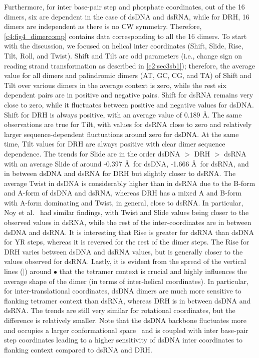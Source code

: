 Furthermore, for inter base-pair step and phosphate coordinates, out of the 16 dimers, six are dependent in the case of dsDNA and dsRNA, while for DRH, 16 dimers are independent as there is no CW symmetry. 
Therefore, \cref{c4:fig4_dimercomp} contains data corresponding to all the 16 dimers.
To start with the discussion, we focused on helical inter coordinates (Shift, Slide, Rise, Tilt, Roll, and Twist).
Shift and Tilt are odd parameters (i.e., change sign on reading strand transformation as described in \cref{c2:sec3sb1}); therefore, the average value for all dimers and palindromic dimers (AT, GC, CG, and TA) of Shift and Tilt over various dimers in the average context is zero, while the rest six dependent pairs are in positive and negative pairs. 
Shift for dsRNA remains very close to zero, while it fluctuates between positive and negative values for dsDNA.
Shift for DRH is always positive, with an average value of 0.189 \AA.
The same observations are true for Tilt, with values for dsRNA close to zero and relatively larger sequence-dependent fluctuations around zero for dsDNA.
At the same time, Tilt values for DRH are always positive with clear dimer sequence dependence.
The trends for Slide are in the order dsDNA $>$ DRH $>$ dsRNA with an average Slide of around -0.397 \AA \ for dsDNA, -1.666 \AA \ for dsRNA, and in between dsDNA and dsRNA for DRH but slightly closer to dsRNA.
The average Twist in dsDNA is considerably higher than in dsRNA due to the B-form and A-form of dsDNA and dsRNA, whereas DRH has a mixed A and B-form with A-form dominating and Twist, in general, close to dsRNA.
In particular, Noy et al.~\cite{noy2005structure} had similar findings, with Twist and Slide values being closer to the observed values in dsRNA, while the rest of the inter-coordinates are in between dsDNA and dsRNA.
It is interesting that Rise is greater for dsRNA than dsDNA for YR steps, whereas it is reversed for the rest of the dimer steps.
The Rise for DRH varies between dsDNA and dsRNA values, but is generally closer to the values observed for dsRNA.
Lastly, it is evident from the spread of the vertical lines ($|$) around $\bullet$ that the tetramer context is crucial and highly influences the average shape of the dimer (in terms of inter-helical coordinates).
In particular, for inter-translational coordinates, dsDNA dimers are much more sensitive to flanking tetramer context than dsRNA, whereas DRH is in between dsDNA and dsRNA.
The trends are still very similar for rotational coordinates, but the difference is relatively smaller. 
Note that the dsDNA backbone fluctuates more and occupies a larger conformational space~\cite{noy2004relative,noy2005structure} and is coupled with inter base-pair step coordinates leading to a higher sensitivity of dsDNA inter coordinates to flanking context compared to dsRNA and DRH.

